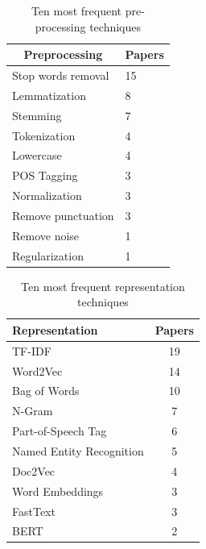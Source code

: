 \begin{table}[H]
\centering
\caption{Ten most frequent pre-processing techniques}
\label{tab:rsl_freq_pre_processing}

    \begin{tabular}{@{}ll@{}}
    
    \toprule
    \multicolumn{1}{c}{\textbf{Preprocessing}} & \multicolumn{1}{c}{\textbf{Papers}} \\ \midrule
    Stop words removal                         & 15                                  \\
    Lemmatization                              & 8                                   \\
    Stemming                                   & 7                                   \\
    Tokenization                               & 4                                   \\
    Lowercase                                  & 4                                   \\
    POS Tagging                                & 3                                   \\
    Normalization                              & 3                                   \\
    Remove punctuation                         & 3                                   \\
    Remove noise                               & 1                                   \\
    Regularization                             & 1                                   \\ \bottomrule
    
    \end{tabular}
\end{table}


\begin{table}[H]
\centering
\caption{Ten most frequent representation techniques}
\label{tab:rsl_freq_representation}
\begin{tabular}{@{}lc@{}}
\toprule
\textbf{Representation}  & \textbf{Papers} \\ \midrule
TF-IDF                   & 19              \\
Word2Vec                 & 14              \\
Bag of Words             & 10              \\
N-Gram                   & 7               \\
Part-of-Speech Tag       & 6               \\
Named Entity Recognition & 5               \\
Doc2Vec                  & 4               \\
Word Embeddings          & 3               \\
FastText                 & 3               \\ 
BERT                     & 2               \\ \bottomrule
\end{tabular}
\end{table}

